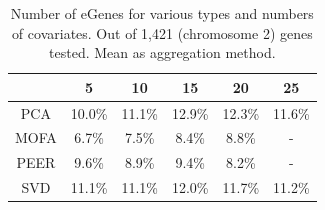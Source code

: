 
\begin{table}[h]
    \centering
    \begin{tabular}{c|c c c c c}
    &         5 & 10 & 15 & 20 & 25  \\
    \hline
    PCA   & 10.0\% & 11.1\% &  12.9\% & 12.3\% & 11.6\%  \\
    MOFA  & 6.7\% & 7.5\% &  8.4\% & 8.8\% & -  \\
    PEER  & 9.6\% & 8.9\% &  9.4\% & 8.2\% & -  \\
    SVD  & 11.1\% & 11.1\% &  12.0\% & 11.7\% & 11.2\% \\
    \end{tabular}
    \caption[Number and type of covariate comparison]{Number of eGenes for various types and numbers of covariates. 
    Out of 1,421 (chromosome 2) genes tested.
    Mean as aggregation method.}
    \label{tab:covariates}
\end{table}



